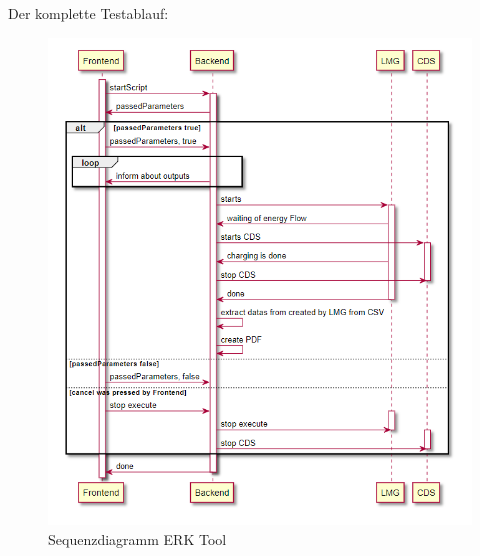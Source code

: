         \newpage
        Der komplette Testablauf:
        \begin{figure}[H]
            \centering
            \includegraphics[width=1\textwidth]{./UML.png}
            \caption{Sequenzdiagramm ERK Tool}
            \label{fig:flow around cylinder}
        \end{figure}



